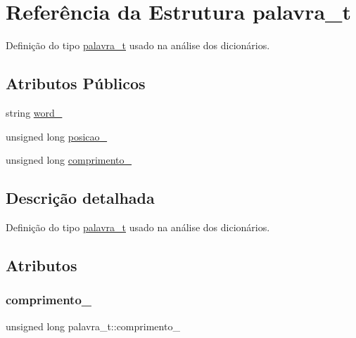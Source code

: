 \hypertarget{structpalavra__t}{}\section{Referência da Estrutura palavra\+\_\+t}
\label{structpalavra__t}


Definição do tipo \mbox{\hyperlink{structpalavra__t}{palavra\+\_\+t}} usado na análise dos dicionários.  


\subsection*{Atributos Públicos}
\begin{DoxyCompactItemize}
\item 
string \mbox{\hyperlink{structpalavra__t_a91347e04a25cc9441280eaf177fc3ef3}{word\+\_\+}}
\item 
unsigned long \mbox{\hyperlink{structpalavra__t_af82806288cb3a54ff5313189a5fce1e5}{posicao\+\_\+}}
\item 
unsigned long \mbox{\hyperlink{structpalavra__t_a8d3c556ce5092b73f7a398b38cb520cc}{comprimento\+\_\+}}
\end{DoxyCompactItemize}


\subsection{Descrição detalhada}
Definição do tipo \mbox{\hyperlink{structpalavra__t}{palavra\+\_\+t}} usado na análise dos dicionários. 

\subsection{Atributos}
\mbox{\label{structpalavra__t_a8d3c556ce5092b73f7a398b38cb520cc}} 
\subsubsection{\texorpdfstring{comprimento\_}{comprimento\_}}
{\footnotesize\ttfamily unsigned long palavra\+\_\+t\+::comprimento\+\_\+}

\mbox{\label{structpalavra__t_af82806288cb3a54ff5313189a5fce1e5}} 
